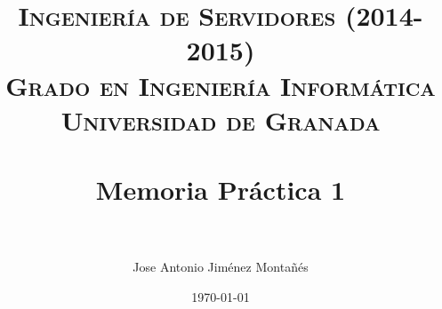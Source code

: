 

\usepackage[pdftex,colorlinks=true,linkcolor=negro,urlcolor=blue]{hyperref,xcolor}

\graphicspath{ {./images/} }
\usepackage{subfig}
\hypersetup{citecolor=blue}

\title{	
\normalfont \normalsize 
\textsc{{\bf Ingeniería de Servidores (2014-2015)} \\ Grado en Ingeniería Informática \\ Universidad de Granada} \\ [25pt]
\horrule{0.5pt} \\[0.4cm] %
\huge Memoria Práctica 1 \\ %
\horrule{2pt} \\[0.5cm] %
}

\author{Jose Antonio Jiménez Montañés}

\date{\normalsize\today}

%





\maketitle %

\newpage %

\tableofcontents %

\listoffigures


\newpage

